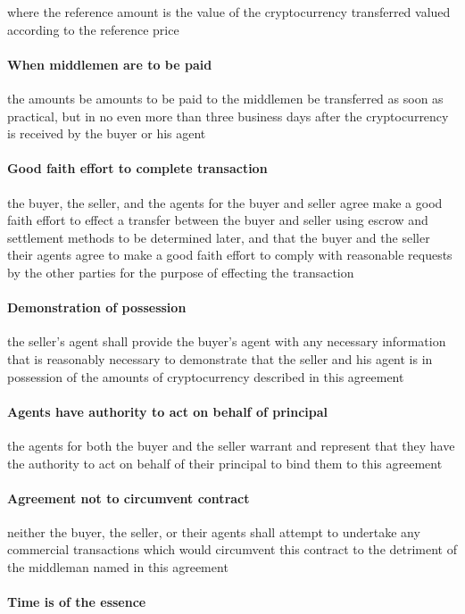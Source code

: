 \documentclass[10pt]{article}
\begin{document}
where the reference amount is the value of the cryptocurrency transferred valued according to the reference price

\paragraph{When middlemen are to be paid} the amounts be amounts to be paid to the middlemen be transferred as soon as practical, but in no even more than three business days after the cryptocurrency is received by the buyer or his agent

\paragraph{Good faith effort to complete transaction} the buyer, the seller, and the agents for the buyer and seller agree make a good faith effort to effect a transfer between the buyer and seller using escrow and settlement methods to be determined later, and that the buyer and the seller their agents agree to make a good faith effort to comply with reasonable requests by the other parties for the purpose of effecting the transaction

\paragraph{Demonstration of possession} the seller’s agent shall provide the buyer’s agent with any necessary information that is reasonably necessary to demonstrate that the seller and his agent is in possession of the amounts of cryptocurrency described in this agreement

\paragraph{Agents have authority to act on behalf of principal} the agents for both the buyer and the seller warrant and represent that they have the authority to act on behalf of their principal to bind them to this agreement

\paragraph{Agreement not to circumvent contract} neither the buyer, the seller, or their agents shall attempt to undertake any commercial transactions which would circumvent this contract to the detriment of the middleman named in this agreement

\paragraph{Time is of the essence}
\end{document}
